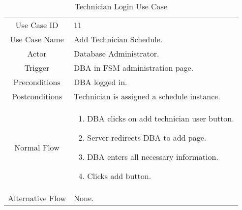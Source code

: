 	\begin{table}[H]
		\centering
		\renewcommand{\arraystretch}{1.5}
		\begin{tabular}[t]{ c  m{10cm} }
			Use Case ID & 11  \\
			Use Case Name & Add Technician Schedule. \\
			Actor & Database Administrator. \\
			Trigger & DBA in FSM administration page. \\
			Preconditions & DBA logged in. \\
			Postconditions & Technician is assigned a schedule instance. \\
			Normal Flow &\begin{enumerate}
				\item DBA clicks on add technician user button.
				\item Server redirects DBA to add page.
				\item DBA enters all necessary information.
				\item Clicks add button.
			\end{enumerate}\\
			Alternative Flow & None. \\
		\end{tabular}
		\caption{Technician Login Use Case}
		\renewcommand{\arraystretch}{1.0}
	\end{table}